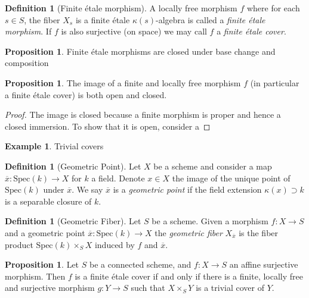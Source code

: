 \documentclass{article}
\theoremstyle{definition}
\newtheorem{proposition}[theorem]{Proposition}
\newtheorem{definition}[theorem]{Definition}
\newtheorem{example}[theorem]{Example}
\theoremstyle{remark}
\begin{document}
\begin{definition}[Finite \'etale morphism]
	A locally free morphism $f$ where for each $s \in S$, the fiber $X_s$ is a finite \'etale $\kappa(s)$-algebra is called a \textit{finite \'etale morphism}.
	If $f$ is also surjective (on space) we may call $f$ a \textit{finite \'etale cover}.
\end{definition}


\begin{proposition}
Finite \'etale morphisms are closed under base change and composition
\end{proposition}

\begin{proposition}
	The image of a finite and locally free morphism $f$ (in particular a finite \'etale cover) is both open and closed.
\end{proposition}

\begin{proof}
	The image is closed because a finite morphism is proper and hence a closed immersion.
	To show that it is open, consider a
\end{proof}

\begin{example}
	Trivial covers
\end{example}

\begin{definition}[Geometric Point]
	Let $X$ be a scheme and consider a map $\overline{x}: \text{Spec}(k) \to X$ for $k$ a field.
	Denote $x \in X$ the image of the unique point of $\text{Spec}(k)$ under $\overline{x}$.
	We say $\overline{x}$ is a \textit{geometric point} if the field extension $\kappa(x) \supset k$ is a separable closure of $k$.
\end{definition}

\begin{definition}[Geometric Fiber]
	Let $S$ be a scheme. 
	Given a morphism $f: X \to S$ and a geometric point $\overline{x}: \text{Spec}(k) \to X$ the \textit{geometric fiber} $X_{\overline{x}}$ is the fiber product $\text{Spec}(k) \times_S X$ induced by $f$ and $\overline{x}$.
\end{definition}


\begin{proposition}
	Let $S$ be a connected scheme, and $f\colon X \to S$ an affine surjective morphism.
	Then $f$ is a finite \'etale cover if and only if there is a finite, locally free and surjective morphism $g: Y \to S$ such that $X \times_S Y$ is a trivial cover of $Y$.
\end{proposition}
\end{document}
